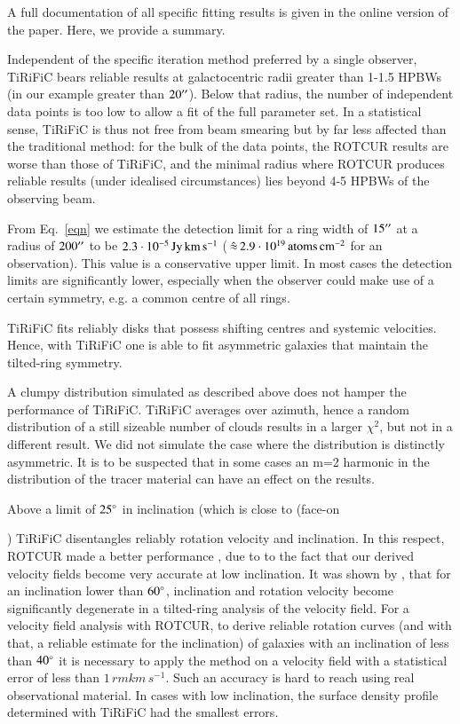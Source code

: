\documentclass[oldversion]{aa}
\renewcommand{\deg}{\hbox{$^\circ$}}
\newcommand{\cng}[1]{{#1}}
\newcommand{\cngs}[1]{{#1}}
\begin{document}
{{A full documentation of all specific fitting results is given in the
online version of the paper. Here, we provide a summary.
  
Independent of the specific iteration method preferred by a single observer,
TiRiFiC
bears reliable results at galactocentric radii greater than 1-1.5 HPBWs (in our example greater than $20\hbox{$^{\prime\prime}$}$). Below that radius, the
number of independent data points is too low to allow a fit of the
full parameter set. In a statistical sense, TiRiFiC is thus not free
from beam smearing but by far less affected than the traditional
method: for the bulk of the data points, the ROTCUR results are worse
than those of TiRiFiC, and the minimal radius where ROTCUR produces
reliable results (under idealised circumstances) lies beyond 4-5 HPBWs
of the observing beam. 

From Eq.~\ref{eqn} we estimate the detection limit for a ring width of
$15\hbox{$^{\prime\prime}$}$ at a radius of $200\hbox{$^{\prime\prime}$}$ to be $2.3\cdot 10^{-5}\,{\rm
Jy}\,{\rm km}\,{\rm s}^{-1}$ ($\,\hat{\approx}\, 2.9\cdot 10^{19} \,{\rm
atoms}\,{\rm cm}^{-2}$ for an  observation). This value is a
conservative upper limit. In most cases the detection limits are
significantly lower, especially when the observer could make use of a
certain symmetry, e.g. a common centre of all rings.

TiRiFiC fits reliably disks that possess shifting centres and systemic
velocities. Hence, with TiRiFiC one is able to fit asymmetric galaxies
that maintain the tilted-ring symmetry.

A clumpy  distribution simulated as described above does
not hamper the performance of TiRiFiC. TiRiFiC averages over
azimuth, hence a random distribution of a still sizeable number of
clouds results in a larger $\chi^2$, but not in a different result. We did
not simulate the case where the  distribution is distinctly
asymmetric. It is to be suspected that in some cases an m=2 harmonic
in the distribution of the tracer material can have an effect on the
results.

Above a limit of $25\deg$ in inclination (which is close to \cngs(face-on}) TiRiFiC disentangles reliably
rotation velocity and inclination. In this respect, ROTCUR made a
better performance \cng{, due to to the fact that our derived velocity fields become very accurate at low inclination. It was shown by \citet[][]{Begemann87}, that for an inclination lower than $60\deg$, inclination and rotation velocity become significantly degenerate in a tilted-ring analysis of the velocity field. For a velocity field analysis with ROTCUR, to derive reliable rotation curves (and with that, a reliable estimate for the inclination) of galaxies with an inclination of less than $40\deg$ it is necessary to apply the method on a velocity field with a statistical error of less than $1\,{rm km}\,{s}^{-1}$. Such an accuracy is hard to reach using real observational material.} In cases with low inclination, the surface density
profile determined with TiRiFiC had the smallest errors.

}
\end{document}
